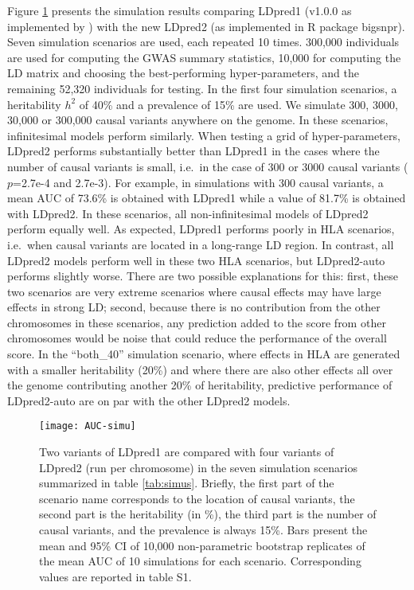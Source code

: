 \documentclass{bioinfo}
\begin{document}
Figure \ref{fig:AUC-simu} presents the simulation results comparing LDpred1 (v1.0.0 as implemented by \cite{vilhjalmsson2015modeling}) with the new LDpred2 (as implemented in R package bigsnpr). 
Seven simulation scenarios are used, each repeated 10 times.
300,000 individuals are used for computing the GWAS summary statistics, 10,000 for computing the LD matrix and choosing the best-performing hyper-parameters, and the remaining 52,320 individuals for testing.
In the first four simulation scenarios, a heritability $h^2$ of 40\% and a prevalence of 15\% are used. We simulate 300, 3000, 30,000 or 300,000 causal variants anywhere on the genome.
In these scenarios, infinitesimal models perform similarly. 
When testing a grid of hyper-parameters, LDpred2 performs substantially better than LDpred1 in the cases where the number of causal variants is small, i.e.\ in the case of 300 or 3000 causal variants ($p$=2.7e-4 and 2.7e-3). 
For example, in simulations with 300 causal variants, a mean AUC of 73.6\% is obtained with LDpred1 while a value of 81.7\% is obtained with LDpred2.
In these scenarios, all non-infinitesimal models of LDpred2 perform equally well.
As expected, LDpred1 performs poorly in HLA scenarios, i.e.\ when causal variants are located in a long-range LD region. 
In contrast, all LDpred2 models perform well in these two HLA scenarios, but LDpred2-auto performs slightly worse.
There are two possible explanations for this: first, these two scenarios are very extreme scenarios where causal effects may have large effects in strong LD; second, because there is no contribution from the other chromosomes in these scenarios, any prediction added to the score from other chromosomes would be noise that could reduce the performance of the overall score.
In the ``both\_40'' simulation scenario, where effects in HLA are generated with a smaller heritability (20\%) and where there are also other effects all over the genome contributing another 20\% of heritability, predictive performance of LDpred2-auto are on par with the other LDpred2 models.


\begin{figure}[htbp]
	\centering
	\texttt{[image: AUC-simu]}
	\caption{Two variants of LDpred1 are compared with four variants of LDpred2 (run per chromosome) in the seven simulation scenarios summarized in table \ref{tab:simus}. Briefly, the first part of the scenario name corresponds to the location of causal variants, the second part is the heritability (in \%), the third part is the number of causal variants, and the prevalence is always 15\%.
	Bars present the mean and 95\% CI of 10,000 non-parametric bootstrap replicates of the mean AUC of 10 simulations for each scenario. 
	Corresponding values are reported in table S1.
	}
	\label{fig:AUC-simu}
\end{figure}
\end{document}
